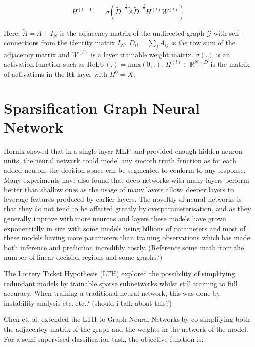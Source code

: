 \documentclass[honours,12pt]{unswthesis}
\numberwithin{equation}{section}
\begin{document}
\begin{equation}
    H^{(l+1)} = \sigma(\tilde{D}^{-\frac{1}{2}} \tilde{A} \tilde{D}^{-\frac{1}{2}} H^{(l)} W^{(l)})
\end{equation}

\noindent Here, $\tilde{A} = A + I_N$ is the adjacency matrix of the undirected graph $\mathcal{G}$ with self-connections from the identity matrix $I_N$.
$\tilde{D_{ii}} = \sum_{j} \tilde{A}_{ij} $ is the row sum of the adjacency matrix and $W^{(l)}$ is a layer trainable weight matrix. 
$\sigma(.)$ is an activation function such as $\text{ReLU}(.) = \text{max}(0, .)$. $H^{(l)} \in \mathbb{R}^{N \times D}$ is the matrix of activations
in the lth layer with $H^0 = X$. 


\section{Sparsification Graph Neural Network}\label{sparse-learning}

Hornik\cite{HORNIK1991251} showed that
in a single layer MLP and provided enough hidden neuron units, the neural network could model any smooth truth function as for each added neuron, the decision space can be
segmented to conform to any response. 
Many experiments have also found that deep networks with many layers perform better than shallow ones\cite{NIPS2014_109d2dd3}\cite{pmlr-v70-raghu17a}
as the usage of many layers allows deeper layers to leverage features produced by earlier layers.
The noveltly of neural networks is that they do not tend to be affected greatly by overparameterisation\cite{Cao_Gu_2020}, and as they generally improve with more neurons
and layers these models have grown exponentially in size with some models using billions of parameters and most of these models having more parameters than training observations
which has made both inference and prediction incredibly costly.  (Reference some math from the number of linear decision regions and some graphs?)
 
The Lottery Ticket Hypothesis (LTH)\cite{frankle2020linear} explored the possibility of simplifying redundant models by trainable sparse subnetworks whilst
still training to full accuracy. When training a traditional neural network, this was done by instability analysis etc. etc.? (should i talk about this?)

Chen et. al.\cite{chen2021unified} extended the LTH to Graph Neural Networks by co-simplifying both the adjacentcy matrix of the graph and the weights in 
the network of the model. For a semi-supervised classification task, the objective function is:
\end{document}
